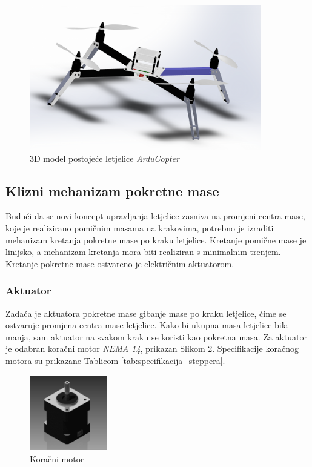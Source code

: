 \documentclass[11pt,a4paper]{article}
\begin{document}
\begin{figure}[H]
	\centering
	\includegraphics[width=0.9\textwidth]{figures/arducopter_original.png}
	\caption{3D model postojeće letjelice \textit{ArduCopter}}
	\label{fig:3D_drone_original}
\end{figure}

\subsection{Klizni mehanizam pokretne mase}

Budući da se novi koncept upravljanja letjelice zasniva na promjeni centra mase, koje je realizirano pomičnim masama na krakovima, potrebno je izraditi mehanizam kretanja pokretne mase po kraku letjelice. Kretanje pomične mase je linijsko, a mehanizam kretanja mora biti realiziran s minimalnim trenjem. Kretanje pokretne mase ostvareno je električnim aktuatorom.

\subsubsection{Aktuator}
Zadaća je aktuatora pokretne mase gibanje mase po kraku letjelice, čime se ostvaruje promjena centra mase letjelice. Kako bi ukupna masa letjelice bila manja, sam aktuator na svakom kraku se koristi kao pokretna masa. Za aktuator je odabran koračni motor \textit{NEMA 14}, prikazan Slikom \ref{fig:stepper_motor}. Specifikacije koračnog motora su prikazane Tablicom \ref{tab:specifikacija_steppera}.

\begin{figure}[H]
	\centering
	\includegraphics[width=0.3\textwidth]{figures/StepperMotor.jpg}
	\caption{Koračni motor}
	\label{fig:stepper_motor}
\end{figure}
\end{document}

